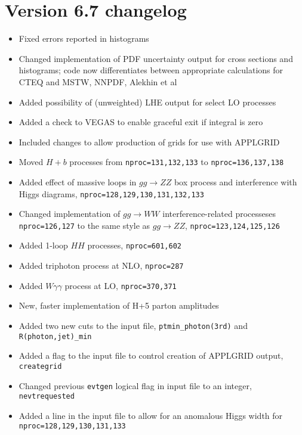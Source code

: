 \documentclass[12pt]{article}
\begin{document}
\section{Version 6.7 changelog}
\label{changelog6.7}
\begin{itemize}
\item Fixed errors reported in histograms
\item Changed implementation of PDF uncertainty output for cross sections and histograms; code now differentiates
between appropriate calculations for CTEQ and MSTW, NNPDF, Alekhin et al
\item Added possibility of (unweighted) LHE output for select LO processes
\item Added a check to VEGAS to enable graceful exit if integral is zero
\item Included changes to allow production of grids for use with APPLGRID
\item Moved $H+b$ processes from {\tt nproc=131,132,133} to {\tt nproc=136,137,138}
\item Added effect of massive loops in $gg\to ZZ$ box process and interference with Higgs diagrams,
{\tt nproc=128,129,130,131,132,133}
\item Changed implementation of $gg \to WW$ interference-related processeses {\tt nproc=126,127} to
the same style as $gg\to ZZ$, {\tt nproc=123,124,125,126}
\item Added 1-loop $HH$ processes,  {\tt nproc=601,602}
\item Added triphoton process at NLO, {\tt nproc=287}
\item Added $W\gamma\gamma$ process at LO,  {\tt nproc=370,371}
\item New, faster implementation of H+5 parton amplitudes 
\item Added two new cuts to the input file, {\tt ptmin\_photon(3rd)} and {\tt R(photon,jet)\_min}
\item Added a flag to the input file to control creation of APPLGRID output, {\tt creategrid}
\item Changed previous {\tt evtgen} logical flag in input file to an integer, {\tt nevtrequested}
\item Added a line in the input file to allow for an anomalous Higgs width for {\tt nproc=128,129,130,131,133}
\end{itemize}
\end{document}
